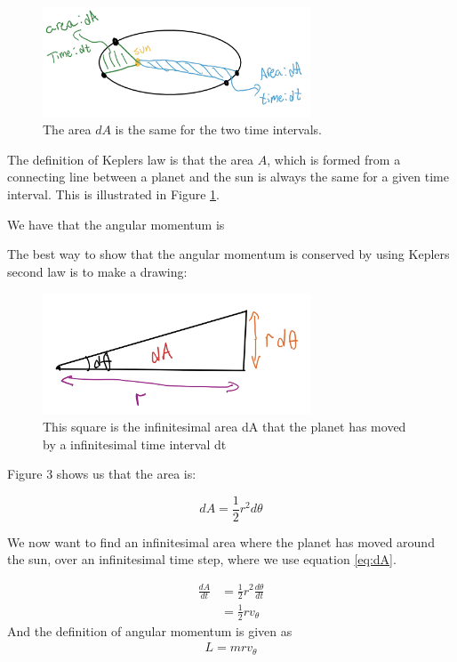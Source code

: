 \documentclass{article}
\begin{document}
\begin{figure}[H]
	\centering
	\includegraphics[width=80mm]{K2L.jpg}
	\caption{The area $dA$ is the same for the two time intervals.}
	\label{fig:Kep}
\end{figure}

The definition of Keplers law is that the area $A$, which is formed from a connecting line between a planet and the sun is always the same for a given time interval. This is illustrated in Figure \ref{fig:Kep}.

We have that the angular momentum is 

The best way to show that the angular momentum is conserved by using Keplers second law is to make a drawing:

\begin{figure}[H]
	\centering
	\includegraphics[width=80mm]{sketch.jpg}
	\caption{This square is the infinitesimal area dA that the planet has moved by a infinitesimal time interval dt}
	\label{fig:1bplot}
\end{figure}

Figure 3 shows us that the area is:

\begin{equation}
    dA=\frac{1}{2}r^2d\theta
\label{eq:dA}
\end{equation}

We now want to find an infinitesimal area where the planet has moved around the sun, over an infinitesimal time step, where we use equation \ref{eq:dA}.

\begin{align}
    \frac{dA}{dt}&=\frac{1}2{r^2}\frac{d\theta}{dt}\\
    &=\frac{1}{2}rv_\theta
    \label{eq:dadt}
\end{align}
And the definition of angular momentum is given as
\begin{align}
    L=mrv_\theta
     \label{eq:L}
\end{align}
\end{document}

